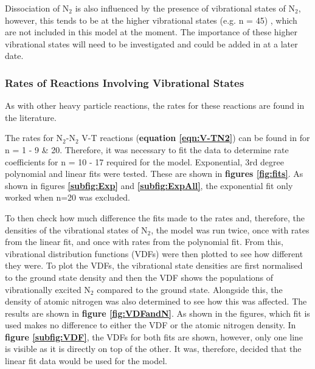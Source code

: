 \documentclass[11pt, oneside]{article}   	%
\begin{document}
Dissociation of N$_2$ is also influenced by the presence of vibrational states of N$_2$, however, this tends to be at the higher vibrational states (e.g. n = 45) \cite{Guerra2004kinetic}, which are not included in this model at the moment. 
The importance of these higher vibrational states will need to be investigated and could be added in at a later date.


\subsubsection{Rates of Reactions Involving Vibrational States}

As with other heavy particle reactions, the rates for these reactions are found in the literature.


The rates for N$_2$-N$_2$ V-T reactions (\textbf{equation \ref{eqn:V-TN2}}) can be found in  \cite{Billing1979vv} for n = 1 - 9 \& 20.
Therefore, it was necessary to fit the data to determine rate coefficients for n = 10 - 17 required for the model.
Exponential, 3rd degree polynomial and linear fits were tested.
These are shown in \textbf{figures \ref{fig:fits}}.
As shown in figures \textbf{\ref{subfig:Exp}} and \textbf{\ref{subfig:ExpAll}}, the exponential fit only worked when n=20 was excluded.

To then check how much difference the fits made to the rates and, therefore, the densities of the vibrational states of N$_2$, the model was run twice, once with rates from the linear fit, and once with rates from the polynomial fit.
From this, vibrational distribution functions (VDFs) were then plotted to see how different they were.
To plot the VDFs, the vibrational state densities are first normalised to the ground state density and then the VDF shows the populations of vibrationally excited N$_2$ compared to the ground state.
Alongside this, the density of atomic nitrogen was also determined to see how this was affected.
The results are shown in \textbf{figure \ref{fig:VDFandN}}.
As shown in the figures, which fit is used makes no difference to either the VDF or the atomic nitrogen density.
In \textbf{figure \ref{subfig:VDF}}, the VDFs for both fits are shown, however, only one line is visible as it is directly on top of the other.
It was, therefore, decided that the linear fit data would be used for the model.



\end{document}
